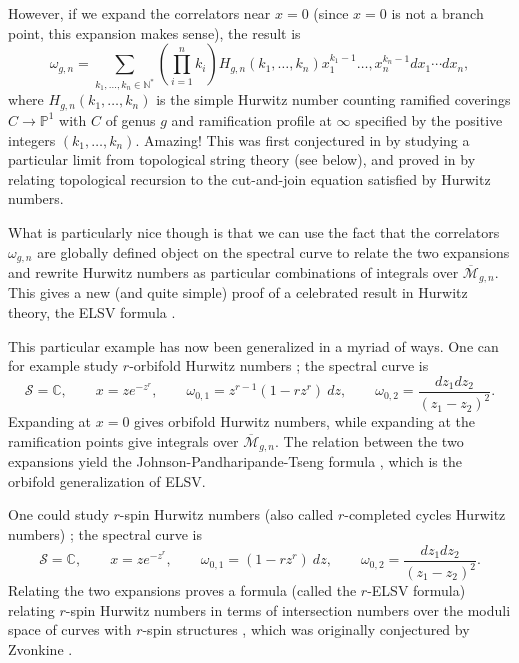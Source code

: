 \documentclass[reqno,oneside,11pt]{amsart}
\theoremstyle{plain}
\theoremstyle{definition}
\theoremstyle{remark}
\numberwithin{equation}{section}
\begin{document}
However, if we expand the correlators near $x=0$ (since $x=0$ is not a branch point, this expansion makes sense), the result is
\begin{equation}
\omega_{g,n} = \sum_{k_1,\ldots,k_n \in \mathbb{N}^*}  \left( \prod_{i=1}^n k_i \right) H_{g,n}(k_1,\ldots,k_n) x_1^{k_1-1} \ldots, x_n^{k_n-1} dx_1 \cdots dx_n,
\end{equation}
where $H_{g,n}(k_1,\ldots,k_n)$ is the simple Hurwitz number counting ramified coverings $C \to \mathbb{P}^1$ with $C$ of genus $g$ and ramification profile at $\infty$ specified by the positive integers $(k_1,\ldots,k_n)$. Amazing! This was first conjectured in \cite{BM07} by studying a particular limit from topological string theory (see below), and proved in \cite{EMS09} by relating topological recursion to the cut-and-join equation satisfied by Hurwitz numbers.

What is particularly nice though is that we can use the fact that the correlators $\omega_{g,n}$ are globally defined object on the spectral curve to relate the two expansions and rewrite Hurwitz numbers as particular combinations of integrals over $\overline{\mathcal{M}}_{g,n}$. This gives a new (and quite simple) proof of a celebrated result in Hurwitz theory, the ELSV formula \cite{ELSV00}.

This particular example has now been generalized in a myriad of ways. One can for example study $r$-orbifold Hurwitz numbers \cite{DLN12,BHLM13,DLPS15}; the spectral curve is
  \begin{equation}
 \mathcal{S} = \mathbb{C}, \qquad x = z e^{-z^r}, \qquad \omega_{0,1} = z^{r-1}(1-r z^r)\ dz, \qquad \omega_{0,2} = \frac{dz_1 dz_2}{(z_1-z_2)^2}.
 \end{equation}
 Expanding at $x=0$ gives orbifold Hurwitz numbers, while expanding at the ramification points give integrals over $\overline{\mathcal{M}}_{g,n}$. The relation between the two expansions yield the Johnson-Pandharipande-Tseng formula \cite{JPT08}, which is the orbifold generalization of ELSV.
 
 One could study  $r$-spin Hurwitz numbers (also called $r$-completed cycles Hurwitz numbers) \cite{SSZ13,DKPS19}; the spectral curve is
   \begin{equation}
 \mathcal{S} = \mathbb{C}, \qquad x = z e^{-z^r}, \qquad \omega_{0,1} = (1-r z^r)\ dz, \qquad \omega_{0,2} = \frac{dz_1 dz_2}{(z_1-z_2)^2}.
 \end{equation}
 Relating the two expansions proves a formula (called the $r$-ELSV formula) relating $r$-spin Hurwitz numbers in terms of intersection numbers over the moduli space of curves with $r$-spin structures \cite{DKPS19} , which was originally conjectured by Zvonkine \cite{Zv06}.
 
\end{document}
